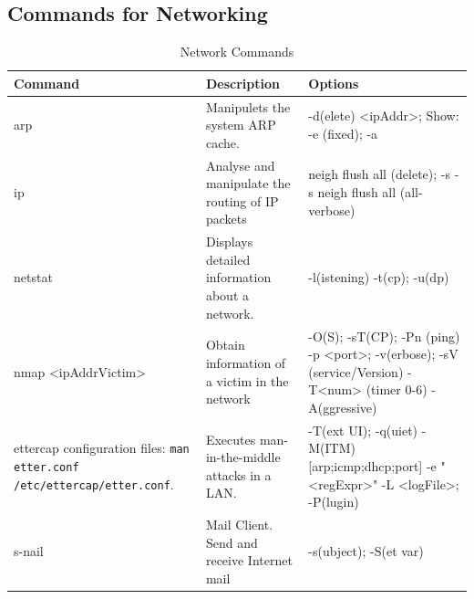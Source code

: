 \subsection*{Commands for Networking}
\begin{table}[H]
	\centering
    \begin{tabular}{|p{6cm}|p{3cm}|p{6cm}|}\hline
        \rowcolor{gray!30}
		\textbf{Command} & \textbf{Description} & \textbf{Options} \\ \hline
		
        arp 
            & Manipulets the system ARP cache.
            & -d(elete) <ipAddr>; 
                \newline Show: -e (fixed); -a 
        \\ \hline

        ip 
            & Analyse and manipulate the routing of IP packets
            & neigh flush all (delete);
                \newline -s -s neigh flush all (all-verbose)
        \\ \hline

        netstat
            & Displays detailed information about a network.
            & -l(istening) \newline -t(cp); -u(dp)
        \\ \hline

        nmap <ipAddrVictim>
            & Obtain information of a victim in the network
            & -O(S); -sT(CP); -Pn (ping)
                \newline -p <port>; 
                \newline -v(erbose); -sV (service/Version)
                \newline -T<num> (timer 0-6)
                \newline -A(ggressive)
        \\ \hline

        ettercap \newline \newline configuration files: \newline \texttt{man etter.conf} \newline \texttt{/etc/ettercap/etter.conf}.
            & Executes man-in-the-middle attacks in a LAN.
            & -T(ext UI); -q(uiet)
            \newline -M(ITM) [arp;icmp;dhcp;port]
            \newline -e "<regExpr>"
            \newline -L <logFile>; -P(lugin)
        \\ \hline

        s-nail 
            & Mail Client. Send and receive Internet mail
            & -s(ubject); -S(et var)
        \\ \hline


    \end{tabular}

    \caption{Network Commands}

    \label{tab:basicNetworkCommands}
\end{table}
\clearpage

